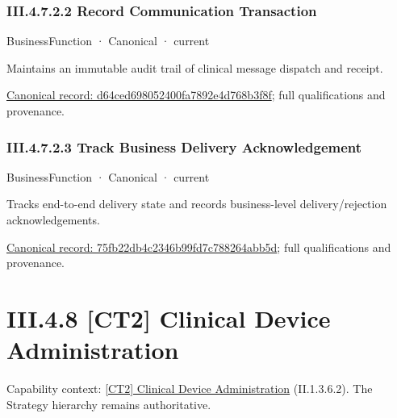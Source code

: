 \subsubsection*{III.4.7.2.2 Record Communication Transaction}
\label{navigation:III.4.7.2.2}

\label{element:d64ced698052400fa7892e4d768b3f8f}
{\small BusinessFunction · Canonical · current}\par

Maintains an immutable audit trail of clinical message dispatch and receipt.


{\footnotesize \href{../../../../continuum/business/business-function/d64ced698052400fa7892e4d768b3f8f.md}{Canonical record: d64ced698052400fa7892e4d768b3f8f}; full qualifications and provenance.}\par
\subsubsection*{III.4.7.2.3 Track Business Delivery Acknowledgement}
\label{navigation:III.4.7.2.3}

\label{element:75fb22db4c2346b99fd7c788264abb5d}
{\small BusinessFunction · Canonical · current}\par

Tracks end-to-end delivery state and records business-level delivery/rejection acknowledgements.


{\footnotesize \href{../../../../continuum/business/business-function/75fb22db4c2346b99fd7c788264abb5d.md}{Canonical record: 75fb22db4c2346b99fd7c788264abb5d}; full qualifications and provenance.}\par
\section*{III.4.8 [CT2] Clinical Device Administration}
\label{navigation:III.4.8}

{\small Capability context: \hyperref[element:31bcd6fda0d14cc8b992cdca39a3cbed]{[CT2] Clinical Device Administration} (II.1.3.6.2). The Strategy hierarchy remains authoritative.}\par
